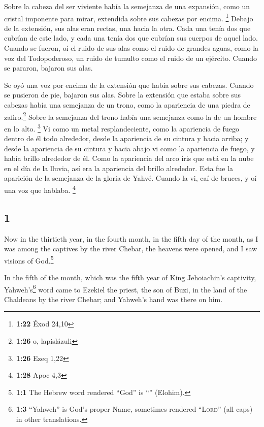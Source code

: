 \begin{paracol}{2}
 Sobre la cabeza del ser viviente había la semejanza de
una expansión, como un cristal imponente para mirar, extendida sobre sus
cabezas por encima. \footnote{\textbf{1:22} Éxod 24,10} 
Debajo de la extensión, sus alas eran rectas, una hacia la otra. Cada
una tenía dos que cubrían de este lado, y cada una tenía dos que cubrían
sus cuerpos de aquel lado.  Cuando se fueron, oí el ruido
de sus alas como el ruido de grandes aguas, como la voz del
Todopoderoso, un ruido de tumulto como el ruido de un ejército. Cuando
se pararon, bajaron sus alas.

 Se oyó una voz por encima de la extensión que había
sobre sus cabezas. Cuando se pusieron de pie, bajaron sus alas.
 Sobre la extensión que estaba sobre sus cabezas había
una semejanza de un trono, como la apariencia de una piedra de
zafiro.\footnote{\textbf{1:26} o, lapislázuli} Sobre la semejanza del
trono había una semejanza como la de un hombre en lo alto. \footnote{\textbf{1:26}
  Ezeq 1,22}  Vi como un metal resplandeciente, como la
apariencia de fuego dentro de él todo alrededor, desde la apariencia de
su cintura y hacia arriba; y desde la apariencia de su cintura y hacia
abajo vi como la apariencia de fuego, y había brillo alrededor de él.
 Como la apariencia del arco iris que está en la nube en
el día de la lluvia, así era la apariencia del brillo alrededor. Esta
fue la aparición de la semejanza de la gloria de Yahvé. Cuando la vi,
caí de bruces, y oí una voz que hablaba. \footnote{\textbf{1:28} Apoc
  4,3}

\switchcolumn
\begin{otherlanguage}{english}

\hypertarget{section-1}{%
\section{1}\label{section-1}}

 Now in the thirtieth year, in the fourth month, in the
fifth day of the month, as I was among the captives by the river Chebar,
the heavens were opened, and I saw visions of God.\footnote{\textbf{1:1}
  The Hebrew word rendered ``God'' is ``'' (Elohim).}

 In the fifth of the month, which was the fifth year of
King Jehoiachin's captivity,  Yahweh's\footnote{\textbf{1:3}
  ``Yahweh'' is God's proper Name, sometimes rendered ``\textsc{Lord}''
  (all caps) in other translations.} word came to Ezekiel the priest,
the son of Buzi, in the land of the Chaldeans by the river Chebar; and
Yahweh's hand was there on him.


\end{otherlanguage}
\end{paracol}
